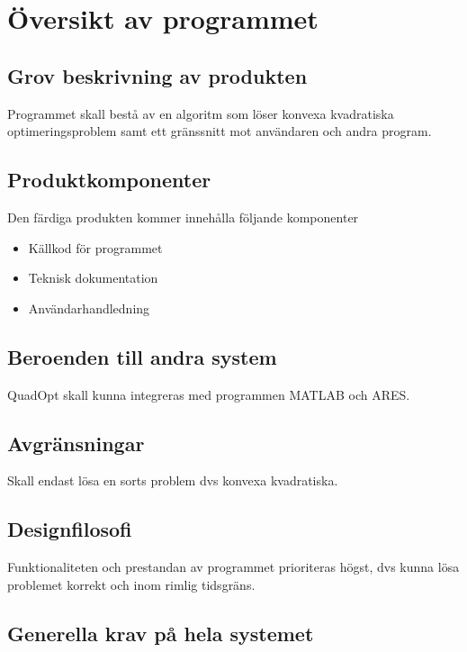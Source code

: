 \section{Översikt av programmet}

\subsection{Grov beskrivning av produkten}
Programmet skall bestå av en algoritm som löser konvexa kvadratiska optimeringsproblem samt ett gränssnitt mot användaren och andra program.      

\subsection{Produktkomponenter}
Den färdiga produkten kommer innehålla följande komponenter
\begin{itemize}
\item{Källkod för programmet}
\item{Teknisk dokumentation}
\item{Användarhandledning}
\end{itemize}

\subsection{Beroenden till andra system}
QuadOpt skall kunna integreras med programmen MATLAB och ARES.

\subsection{Avgränsningar}
Skall endast lösa en sorts problem dvs konvexa kvadratiska. 

\subsection{Designfilosofi}
Funktionaliteten och prestandan av programmet prioriteras högst, dvs kunna lösa problemet korrekt och inom rimlig tidsgräns. 

\subsection{Generella krav på hela systemet}


